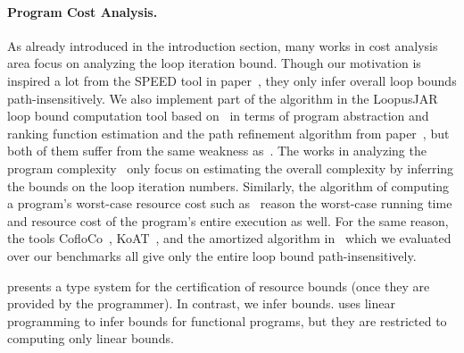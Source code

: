\paragraph{Program Cost Analysis.}
As already introduced in the introduction section, many works in cost analysis area focus on analyzing the loop iteration bound.
Though our motivation is inspired a lot from the SPEED tool in paper~\cite{GulwaniZ10}, they only infer overall loop bounds path-insensitively.
We also implement part of the algorithm in the LoopusJAR loop bound computation tool based on~\cite{SinnZV17} in terms of program abstraction and ranking function estimation
and the path refinement algorithm from paper~\cite{GulwaniJK09}, but both of them suffer from the same weakness as~\cite{GulwaniZ10}.
The works in analyzing the program complexity~\cite{GustafssonEL05, HumenbergerJK18} only focus on estimating 
the overall complexity 
by inferring the bounds on the loop iteration numbers.
Similarly, the algorithm of computing a program's worst-case resource cost
such as~\cite{AlbertAGP08, AliasDFG10} reason the worst-case running time and resource cost of the program's entire execution as well.
For the same reason, the tools CofloCo~\cite{Montoya17, Flores-MontoyaH14, Flores-Montoya16}, KoAT~\cite{BrockschmidtEFFG16, BrockschmidtEFFG14, FalkeKS12, FalkeKS11}, and the amortized algorithm in~\cite{LuCT21} which we evaluated over our benchmarks all give only the entire loop bound path-insensitively.

\cite{CraryW00} presents a type system for the certification of resource bounds (once they are provided by the programmer). In contrast, we infer bounds. 
\cite{JostHLH10} uses linear programming to infer bounds for functional programs, but they are restricted to computing only linear bounds.

